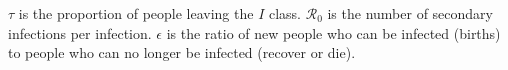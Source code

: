 $\tau$ is the proportion of people leaving the $I$ class.
${\mathcal R_0}$ is the number of secondary infections per infection.
$\epsilon$ is the ratio of new people who can be infected (births) to people who can no longer be infected (recover or die).

